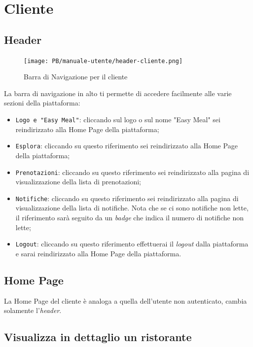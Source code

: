 \newpage
\section{Cliente}

\subsection{Header}

\begin{figure}[htbp]
    \centering
	\texttt{[image: PB/manuale-utente/header-cliente.png]}
    \caption{Barra di Navigazione per il cliente}
\end{figure}

La barra di navigazione in alto ti permette di accedere facilmente alle varie 
sezioni della piattaforma:
\begin{itemize}
	\item \texttt{Logo e "Easy Meal"}: cliccando sul logo o sul nome "Easy Meal"
		sei reindirizzato alla Home Page della piattaforma;

	\item \texttt{Esplora}: cliccando su questo riferimento sei reindirizzato
		alla Home Page della piattaforma;

	\item \texttt{Prenotazioni}: cliccando su questo riferimento sei 
		reindirizzato alla pagina di visualizzazione della lista di
		prenotazioni;

	\item \texttt{Notifiche}: cliccando su questo riferimento sei reindirizzato
		alla pagina di visualizzazione della lista di notifiche. Nota che se ci
		sono notifiche non lette, il riferimento sarà seguito da un \textit{badge} che
		indica il numero di notifiche non lette;

	\item \texttt{Logout}: cliccando su questo riferimento effettuerai il \textit{logout}
		dalla piattaforma e sarai reindirizzato alla Home Page della 
		piattaforma.
\end{itemize}

\subsection{Home Page}

La Home Page del cliente è analoga a quella dell'utente non autenticato, cambia
solamente l'\textit{header}.

\subsection{Visualizza in dettaglio un ristorante}

